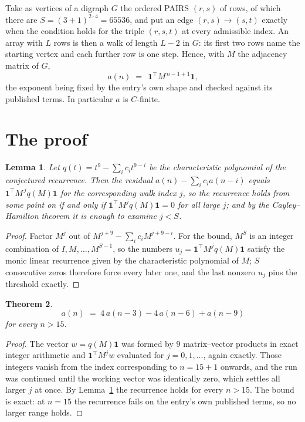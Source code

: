 \documentclass[11pt,a4paper]{article}
\theoremstyle{plain}
\newtheorem{theorem}{Theorem}
\newtheorem{lemma}[theorem]{Lemma}
\theoremstyle{definition}
\begin{document}
Take as vertices of a digraph $G$ the ordered PAIRS $(r,s)$ of rows, of which there are
$S=(3+1)^{2\cdot4}=65536$, and put an edge $(r,s)\to(s,t)$ exactly when the condition
holds for the triple $(r,s,t)$ at every admissible index. An array with $L$ rows is then a
walk of length $L-2$ in $G$: its first two rows name the starting vertex and each further
row is one step. Hence, with $M$ the adjacency matrix of $G$,
\[
a(n)\;=\;\,\mathbf{1}^{\!\top}M^{\,n-1+1}\mathbf{1},
\]
the exponent being fixed by the entry's own shape and checked against its published terms.
In particular $a$ is $C$-finite.

\section{The proof}

\begin{lemma}\label{lem:crit}
Let $q(t)=t^{9}-\sum_i c_it^{9-i}$ be the characteristic polynomial of the
conjectured recurrence. Then the residual $a(n)-\sum_ic_ia(n-i)$ equals
$\mathbf{1}^{\!\top}M^{\,j}q(M)\mathbf{1}$ for the corresponding walk index
$j$, so the recurrence holds from some point on if and only if
$\mathbf{1}^{\!\top}M^{j}q(M)\mathbf{1}=0$ for all large $j$; and by the
Cayley--Hamilton theorem it is enough to examine $j<S$.
\end{lemma}

\begin{proof}
Factor $M^{j}$ out of $M^{j+9}-\sum_ic_iM^{j+9-i}$. For the bound, $M^{S}$
is an integer combination of $I,M,\dots,M^{S-1}$, so the numbers
$u_j=\mathbf{1}^{\!\top}M^{j}q(M)\mathbf{1}$ satisfy the monic linear recurrence given by
the characteristic polynomial of $M$; $S$ consecutive zeros therefore force every later one,
and the last nonzero $u_j$ pins the threshold exactly.
\end{proof}

\begin{theorem}
\[
a(n)\;=\;4\,a(n-3) - 4\,a(n-6) + a(n-9)
\]
for every $n>15$.
\end{theorem}

\begin{proof}
The vector $w=q(M)\mathbf{1}$ was formed by $9$ matrix--vector products in exact
integer arithmetic and $\mathbf{1}^{\!\top}M^{j}w$ evaluated for $j=0,1,\dots$, again
exactly. Those integers vanish from the index corresponding to $n=15+1$ onwards, and the
run was continued until the working vector was identically zero, which settles all larger $j$
at once. By Lemma~\ref{lem:crit} the recurrence holds for every $n>15$. The bound is exact: at $n=15$ the recurrence fails on the entry's own published terms, so no larger range holds.
\end{proof}
\end{document}
